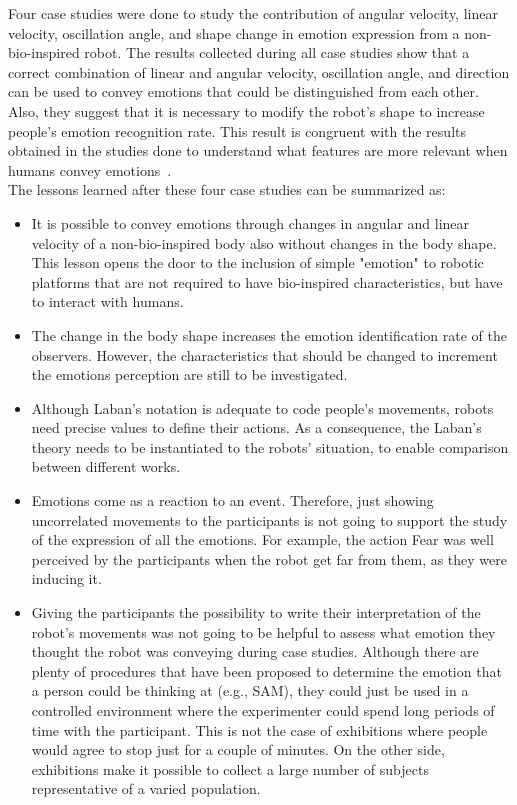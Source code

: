 Four case studies were done to study the contribution of angular velocity, linear velocity, oscillation angle, and shape change in emotion expression from a non-bio-inspired robot. The results collected during all case studies show that a correct combination of linear and angular velocity, oscillation angle, and direction can be used to convey emotions that could be distinguished from each other. Also, they suggest that it is necessary to modify the robot's shape to increase people's emotion recognition rate. This result is congruent with the results obtained in the studies done to understand what features are more relevant when humans convey emotions~\cite{Roether2009,Venture2014}.\\
The lessons learned after these four case studies can be summarized as:
\begin{itemize}
	\item It is possible to convey emotions through changes in angular and linear velocity of a non-bio-inspired body also without changes in the body shape. This lesson opens the door to the inclusion of simple "emotion" to robotic platforms that are not required to have bio-inspired characteristics, but have to interact with humans.
	\item The change in the body shape increases the emotion identification rate of the observers. However, the characteristics that should be changed to increment the emotions perception are still to be investigated.
	\item Although Laban's notation is adequate to code people's movements, robots need precise values to define their actions. As a consequence, the Laban's theory needs to be instantiated to the robots' situation, to enable comparison between different works.
	\item Emotions come as a reaction to an event. Therefore, just showing uncorrelated movements to the participants is not going to support the study of the expression of all the emotions. For example, the action Fear was well perceived by the participants when the robot get far from them, as they were inducing it.
	\item Giving the participants the possibility to write their interpretation of the robot's movements was not going to be helpful to assess what emotion they thought the robot was conveying during case studies. Although there are plenty of procedures that have been proposed to determine the emotion that a person could be thinking at (e.g., SAM), they could just be used in a controlled environment where the experimenter could spend long periods of time with the participant. This is not the case of exhibitions where people would agree to stop just for a couple of minutes. On the other side, exhibitions make it possible to collect a large number of subjects representative of a varied population.

\end{itemize}
